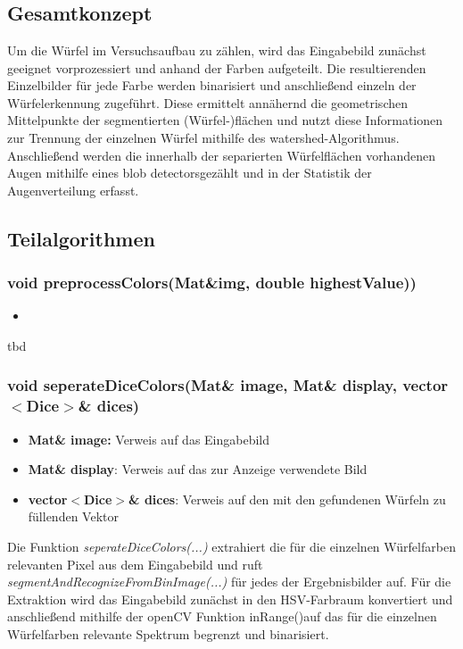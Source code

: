 \documentclass{../Vorlage/sebDenCls}
\begin{document}

\section{}
\subsection{Gesamtkonzept}
Um die Würfel im Versuchsaufbau zu zählen, wird das Eingabebild zunächst geeignet vorprozessiert und anhand der Farben aufgeteilt. Die resultierenden Einzelbilder für jede Farbe werden binarisiert und anschließend einzeln der Würfelerkennung zugeführt. Diese ermittelt annähernd die geometrischen Mittelpunkte der segmentierten (Würfel-)flächen und nutzt diese Informationen zur Trennung der einzelnen Würfel mithilfe des \glqq watershed\grqq-Algorithmus. Anschließend werden die innerhalb der separierten Würfelflächen vorhandenen Augen mithilfe eines \glqq blob detectors\grqq  gezählt und in der Statistik der Augenverteilung erfasst.

\subsection{Teilalgorithmen}

\subsubsection{void preprocessColors(Mat\&img, double highestValue))}
\begin{itemize}
	\item 
\end{itemize}
tbd

\subsubsection{void seperateDiceColors(Mat\& image, Mat\& display, vector $<$Dice$>$\& dices)}
\begin{itemize}
	\item \textbf{Mat\& image:} Verweis auf das Eingabebild
	\item \textbf{Mat\& display}: Verweis auf das zur Anzeige verwendete Bild 
	\item \textbf{vector$<$Dice$>$\& dices}: Verweis auf den mit den gefundenen Würfeln zu füllenden Vektor
\end{itemize}
Die Funktion \emph{seperateDiceColors(...)} extrahiert die für die einzelnen Würfelfarben relevanten Pixel aus dem Eingabebild und ruft \emph{segmentAndRecognizeFromBinImage(...)} für jedes der Ergebnisbilder auf.
Für die Extraktion wird das Eingabebild zunächst in den HSV-Farbraum konvertiert und anschließend mithilfe der openCV Funktion \glqq inRange()\grqq  auf das für die einzelnen Würfelfarben relevante Spektrum begrenzt und binarisiert. 
\end{document}
